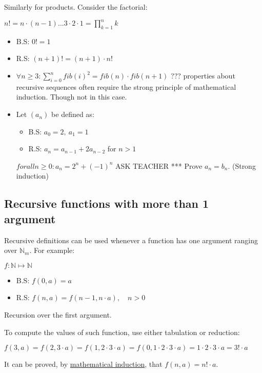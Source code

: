 \documentclass[12pt, a4paper]{book}
\begin{document}
Similarly for products. Consider the factorial:

$n! = n\cdot(n-1) \ldots 3\cdot 2\cdot 1 = \prod_{k = 1}^n k$

\begin{itemize}
    \item B.S: $0! = 1$
    \item R.S: $(n+1)! = (n+1)\cdot n!$
\end{itemize}

\begin{exmp}
    \begin{itemize}
        \item $\forall n\geq 3: \sum_{i = 0}^n {fib(i)}^2 = fib(n)\cdot fib(n+1)$
        ??? properties about recursive sequences often require the strong principle of mathematical induction. Though not in this case.
        \item Let $(a_n)$ be defined as:
        \begin{itemize}
            \item B.S: $a_0 = 2,\ a_1 = 1$
            \item R.S: $a_n = a_{n-1} + 2a_{n-2}$ for $n>1$
        \end{itemize}
        $forall n\geq 0: a_n = 2^n + (-1)^n$ ASK TEACHER ***
        Prove $a_n = b_n$. (Strong induction)
    \end{itemize}
\end{exmp}

\subsection{Recursive functions with more than 1 argument}

Recursive definitions can be used whenever a function has one argument ranging over $\mathbb{N}_m$. For example:

$f:\mathbb{N}\mapsto \mathbb{N}$
\begin{itemize}
    \item B.S: $f(0,a) = a$
    \item R.S: $f(n,a) = f(n-1,n\cdot a),\quad n>0$
\end{itemize}
Recursion over the first argument.

To compute the values of such function, use either tabulation or reduction:

$f(3,a) = f(2,3\cdot a) = f(1, 2\cdot 3\cdot a) = f(0, 1\cdot 2\cdot 3\cdot a) = 1\cdot 2\cdot 3\cdot a = 3!\cdot a$

It can be proved, by \underline{mathematical induction}, that $f(n,a) = n!\cdot a$.
\end{document}
